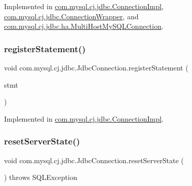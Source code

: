 Implemented in \mbox{\hyperlink{classcom_1_1mysql_1_1cj_1_1jdbc_1_1_connection_impl_a7c4a014cd0c2d58c91a091ec4976434c}{com.\+mysql.\+cj.\+jdbc.\+Connection\+Impl}}, \mbox{\hyperlink{classcom_1_1mysql_1_1cj_1_1jdbc_1_1_connection_wrapper_ae7dff9b2bff1a886f31494f3f5985d12}{com.\+mysql.\+cj.\+jdbc.\+Connection\+Wrapper}}, and \mbox{\hyperlink{classcom_1_1mysql_1_1cj_1_1jdbc_1_1ha_1_1_multi_host_my_s_q_l_connection_a861ff794887b4e5d0cd1ae1d2477bd9b}{com.\+mysql.\+cj.\+jdbc.\+ha.\+Multi\+Host\+My\+S\+Q\+L\+Connection}}.

\mbox{\label{interfacecom_1_1mysql_1_1cj_1_1jdbc_1_1_jdbc_connection_ae2bd1cf8c944f811560e419b9fcefc91}} 
\subsubsection{\texorpdfstring{register\+Statement()}{registerStatement()}}
{\footnotesize\ttfamily void com.\+mysql.\+cj.\+jdbc.\+Jdbc\+Connection.\+register\+Statement (\begin{DoxyParamCaption}\item[{\mbox{\hyperlink{interfacecom_1_1mysql_1_1cj_1_1jdbc_1_1_jdbc_statement}{Jdbc\+Statement}}}]{stmt }\end{DoxyParamCaption})}



Implemented in \mbox{\hyperlink{classcom_1_1mysql_1_1cj_1_1jdbc_1_1_connection_impl_a34559497cf5a4650696890f1de8a0a78}{com.\+mysql.\+cj.\+jdbc.\+Connection\+Impl}}.

\mbox{\label{interfacecom_1_1mysql_1_1cj_1_1jdbc_1_1_jdbc_connection_a44456aec7737354a14eff20638c047fa}} 
\subsubsection{\texorpdfstring{reset\+Server\+State()}{resetServerState()}}
{\footnotesize\ttfamily void com.\+mysql.\+cj.\+jdbc.\+Jdbc\+Connection.\+reset\+Server\+State (\begin{DoxyParamCaption}{ }\end{DoxyParamCaption}) throws S\+Q\+L\+Exception}

